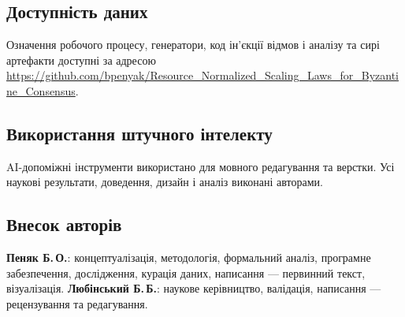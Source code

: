 \subsection*{Доступність даних}
Означення робочого процесу, генератори, код ін'єкції відмов і аналізу та сирі
артефакти доступні за адресою
\url{https://github.com/bpenyak/Resource_Normalized_Scaling_Laws_for_Byzantine_Consensus}.

\subsection*{Використання штучного інтелекту}
AI-допоміжні інструменти використано для мовного редагування та верстки. Усі
наукові результати, доведення, дизайн і аналіз виконані авторами.

\subsection*{Внесок авторів}
\textbf{Пеняк Б.\,О.}: концептуалізація, методологія, формальний аналіз,
програмне забезпечення, дослідження, курація даних, написання --- первинний
текст, візуалізація.
\textbf{Любінський Б.\,Б.}: наукове керівництво, валідація, написання ---
рецензування та редагування.
